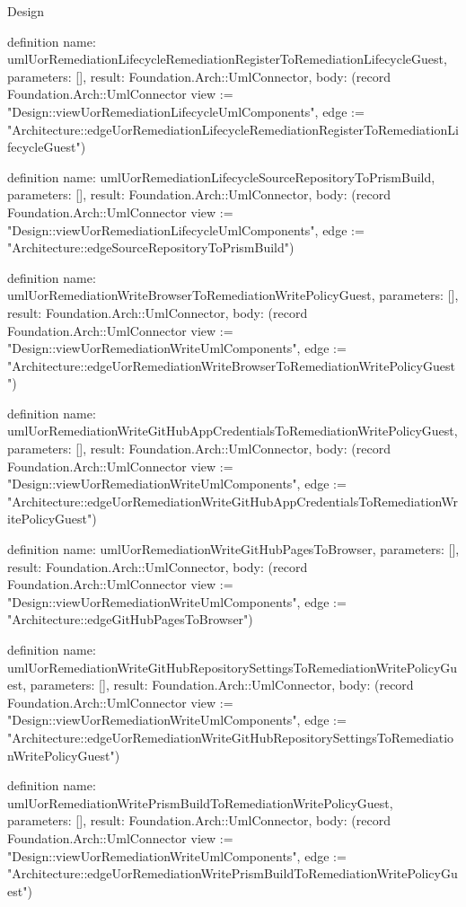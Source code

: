\begin{lexlean}{Design}
\begin{semanticmodule}
definition{
  name: umlUorRemediationLifecycleRemediationRegisterToRemediationLifecycleGuest,
  parameters: [],
  result: Foundation.Arch::UmlConnector,
  body: (record Foundation.Arch::UmlConnector {view := "Design::viewUorRemediationLifecycleUmlComponents", edge := "Architecture::edgeUorRemediationLifecycleRemediationRegisterToRemediationLifecycleGuest"})
}

definition{
  name: umlUorRemediationLifecycleSourceRepositoryToPrismBuild,
  parameters: [],
  result: Foundation.Arch::UmlConnector,
  body: (record Foundation.Arch::UmlConnector {view := "Design::viewUorRemediationLifecycleUmlComponents", edge := "Architecture::edgeSourceRepositoryToPrismBuild"})
}

definition{
  name: umlUorRemediationWriteBrowserToRemediationWritePolicyGuest,
  parameters: [],
  result: Foundation.Arch::UmlConnector,
  body: (record Foundation.Arch::UmlConnector {view := "Design::viewUorRemediationWriteUmlComponents", edge := "Architecture::edgeUorRemediationWriteBrowserToRemediationWritePolicyGuest"})
}

definition{
  name: umlUorRemediationWriteGitHubAppCredentialsToRemediationWritePolicyGuest,
  parameters: [],
  result: Foundation.Arch::UmlConnector,
  body: (record Foundation.Arch::UmlConnector {view := "Design::viewUorRemediationWriteUmlComponents", edge := "Architecture::edgeUorRemediationWriteGitHubAppCredentialsToRemediationWritePolicyGuest"})
}

definition{
  name: umlUorRemediationWriteGitHubPagesToBrowser,
  parameters: [],
  result: Foundation.Arch::UmlConnector,
  body: (record Foundation.Arch::UmlConnector {view := "Design::viewUorRemediationWriteUmlComponents", edge := "Architecture::edgeGitHubPagesToBrowser"})
}

definition{
  name: umlUorRemediationWriteGitHubRepositorySettingsToRemediationWritePolicyGuest,
  parameters: [],
  result: Foundation.Arch::UmlConnector,
  body: (record Foundation.Arch::UmlConnector {view := "Design::viewUorRemediationWriteUmlComponents", edge := "Architecture::edgeUorRemediationWriteGitHubRepositorySettingsToRemediationWritePolicyGuest"})
}

definition{
  name: umlUorRemediationWritePrismBuildToRemediationWritePolicyGuest,
  parameters: [],
  result: Foundation.Arch::UmlConnector,
  body: (record Foundation.Arch::UmlConnector {view := "Design::viewUorRemediationWriteUmlComponents", edge := "Architecture::edgeUorRemediationWritePrismBuildToRemediationWritePolicyGuest"})
}


\end{semanticmodule}
\end{lexlean}
